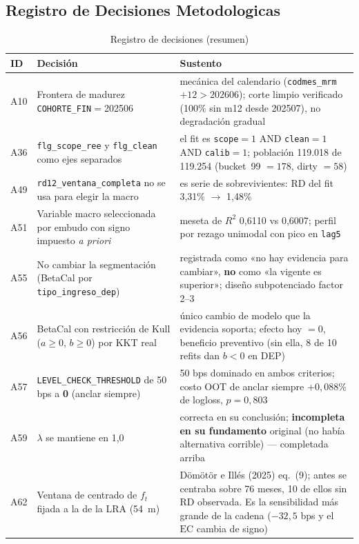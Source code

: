 \documentclass[12pt, a4paper]{article}
\newcommand{\ft}{\ensuremath{f_t}}
\newcommand{\EC}{\ensuremath{\mathrm{EC}}}
\begin{document}
\subsection{Registro de Decisiones Metodologicas}
\begin{table}[H]
\centering
\caption{Registro de decisiones (resumen)}
\scriptsize
\setlength{\tabcolsep}{4pt}
\begin{tabular}{lp{4.3cm}p{7.3cm}}
\toprule
\textbf{ID} & \textbf{Decisión} & \textbf{Sustento} \\
\midrule
A10 & Frontera de madurez \texttt{COHORTE\_FIN}$=$202506 & mecánica del calendario (\texttt{codmes\_mrm}$+12>202606$); corte limpio verificado (100\% sin m12 desde 202507), no degradación gradual \\
A36 & \texttt{flg\_scope\_ree} y \texttt{flg\_clean} como ejes separados & el fit es \texttt{scope}$=1$ AND \texttt{clean}$=1$ AND \texttt{calib}$=1$; población 119.018 de 119.254 (bucket~99 $=178$, dirty $=58$) \\
A49 & \texttt{rd12\_ventana\_completa} no se usa para elegir la macro & es serie de sobrevivientes: RD del fit 3,31\% $\to$ 1,48\% \\
A51 & Variable macro seleccionada por embudo con signo impuesto \emph{a priori} & meseta de $R^2$ 0,6110 vs 0,6007; perfil por rezago unimodal con pico en \texttt{lag5} \\
A55 & No cambiar la segmentación (BetaCal por \texttt{tipo\_ingreso\_dep}) & registrada como «no hay evidencia para cambiar», \textbf{no} como «la vigente es superior»; diseño subpotenciado factor 2--3 \\
A56 & BetaCal con restricción de Kull ($a\ge0$, $b\ge0$) por KKT real & único cambio de modelo que la evidencia soporta; efecto hoy $=0$, beneficio preventivo (sin ella, 8 de 10 refits dan $b<0$ en DEP) \\
A57 & \texttt{LEVEL\_CHECK\_THRESHOLD} de 50 bps a \textbf{0} (anclar siempre) & 50 bps dominado en ambos criterios; costo OOT de anclar siempre $+0{,}088\%$ de logloss, $p=0{,}803$ \\
A59 & $\lambda$ se mantiene en 1,0 & correcta en su conclusión; \textbf{incompleta en su fundamento} original (no había alternativa corrible) --- completada arriba \\
A62 & Ventana de centrado de $\ft$ fijada a la de la LRA (54~m) & Dömötör e Illés (2025) eq.~(9); antes se centraba sobre 76 meses, 10 de ellos sin RD observada. Es la sensibilidad más grande de la cadena ($-32{,}5$ bps y el $\EC$ cambia de signo) \\


\end{tabular}
\end{table}
\end{document}
